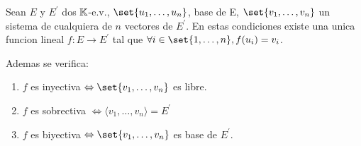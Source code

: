 \begin{theorem}
	Sean \(E \) y \(E^\prime  \) dos \(\mathbb{K} \)-e.v., \(\set{u_1,\ldots,u_n}\), base de E, \(\set{v_1, \ldots, v_n }\) un sistema de cualquiera de \(n \) vectores de \(E^\prime  \). En estas condiciones existe una unica funcion lineal \(f \colon E \to E^\prime  \) tal que \(\forall i \in \set{1,\ldots,n }, f(u_i) = v_i \).

	Ademas se verifica:
	\begin{enumerate}
		\item \(f \) es inyectiva \(\iff \set{v_1,\ldots,v_n }\) es libre.
		\item \(f \) es sobrectiva \(\iff \langle v_1,\ldots,v_n \rangle = E^\prime \)
		\item \(f \) es biyectiva \(\iff \set{v_1,\ldots,v_n }\) es base de \(E^\prime  \).
	\end{enumerate}
\end{theorem}
